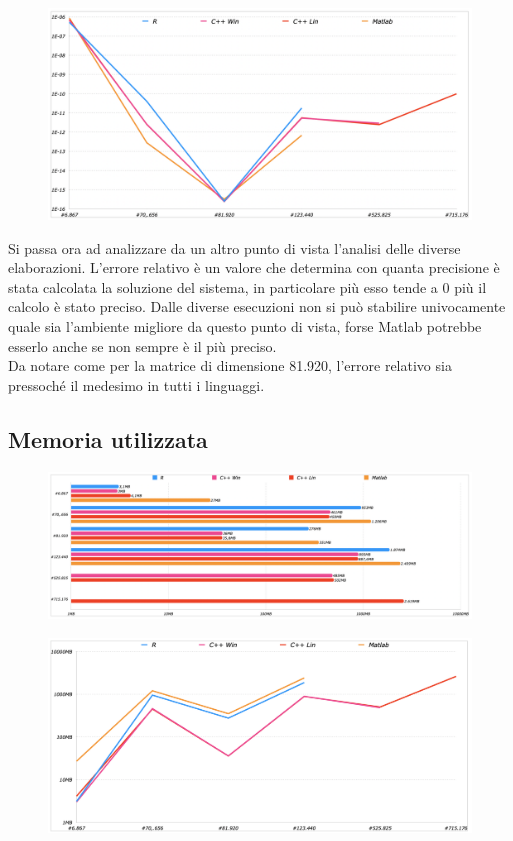 \documentclass[preprint,12pt]{elsarticle}
\begin{document}
\begin{figure}[H]
	\centering
	\includegraphics[width=\linewidth]{errore2}
\end{figure}

Si passa ora ad analizzare da un altro punto di vista l'analisi delle diverse elaborazioni. L'errore relativo è un valore che determina con quanta precisione è stata calcolata la soluzione del sistema, in particolare più esso tende a 0 più il calcolo è stato preciso.
Dalle diverse esecuzioni non si può stabilire univocamente quale sia l'ambiente migliore da questo punto di vista, forse Matlab potrebbe esserlo anche se non sempre è il più preciso.\\
Da notare come per la matrice di dimensione 81.920, l'errore relativo sia pressoché il medesimo in tutti i linguaggi.

\subsection*{Memoria utilizzata}

\begin{figure}[H]
	\centering
	\includegraphics[width=\linewidth]{memoria1}
\end{figure}

\begin{figure}[H]
	\centering
	\includegraphics[width=\linewidth]{memoria2}
\end{figure}
\end{document}
